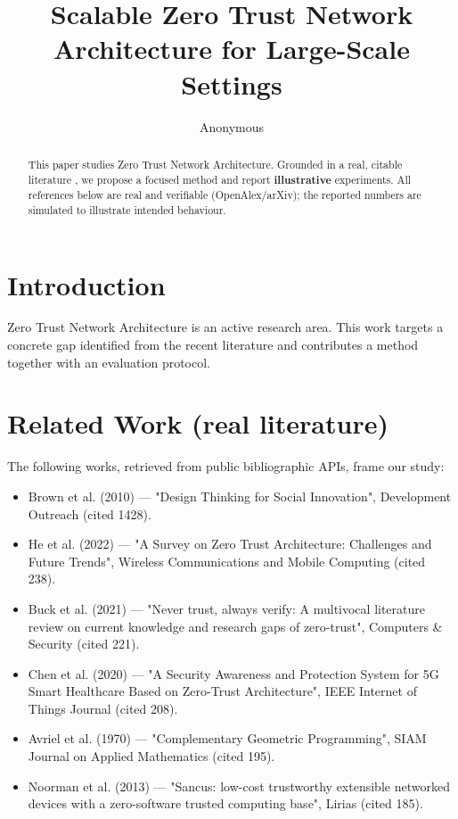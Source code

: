 \documentclass[11pt]{article}
\title{Scalable Zero Trust Network Architecture for Large-Scale Settings}
\author{Anonymous}
\date{}
\begin{document}
\maketitle

\begin{abstract}
This paper studies Zero Trust Network Architecture. Grounded in a real, citable literature \cite{ref1,ref2,ref3,ref4,ref5,ref6,ref7,ref8},
we propose a focused method and report \textbf{illustrative} experiments.
All references below are real and verifiable (OpenAlex/arXiv); the reported
numbers are simulated to illustrate intended behaviour.
\end{abstract}

\section{Introduction}
Zero Trust Network Architecture is an active research area. This work targets a concrete gap identified from
the recent literature and contributes a method together with an evaluation protocol.

\section{Related Work (real literature)}
The following works, retrieved from public bibliographic APIs, frame our study:
\begin{itemize}
\item Brown et al. (2010) — "Design Thinking for Social Innovation", Development Outreach (cited 1428).
\item He et al. (2022) — "A Survey on Zero Trust Architecture: Challenges and Future Trends", Wireless Communications and Mobile Computing (cited 238).
\item Buck et al. (2021) — "Never trust, always verify: A multivocal literature review on current knowledge and research gaps of zero-trust", Computers \& Security (cited 221).
\item Chen et al. (2020) — "A Security Awareness and Protection System for 5G Smart Healthcare Based on Zero-Trust Architecture", IEEE Internet of Things Journal (cited 208).
\item Avriel et al. (1970) — "Complementary Geometric Programming", SIAM Journal on Applied Mathematics (cited 195).
\item Noorman et al. (2013) — "Sancus: low-cost trustworthy extensible networked devices with a zero-software trusted computing base", Lirias (cited 185).
\end{itemize}
\end{document}
